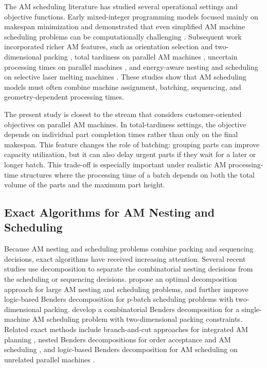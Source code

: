 \documentclass[review,3p,times,authoryear]{elsarticle}
\begin{document}
The AM scheduling literature has studied several operational settings and
objective functions. Early mixed-integer programming models focused mainly on
makespan minimization and demonstrated that even simplified AM machine
scheduling problems can be computationally challenging
\citep{kucukkocMILPModelsMinimise2019}. Subsequent work incorporated richer AM
features, such as orientation selection and two-dimensional packing
\citep{cheMachineSchedulingOrientation2021}, total tardiness on parallel AM
machines \citep{yuMathematicalModelsMinimizing2022}, uncertain processing times
on parallel machines \citep{wuNestingSchedulingParallel2025}, and energy-aware
nesting and scheduling on selective laser melting machines
\citep{yuMathematicalProgrammingModel2024}. These studies show that AM
scheduling models must often combine machine assignment, batching, sequencing,
and geometry-dependent processing times.

The present study is closest to the stream that considers customer-oriented
objectives on parallel AM machines. In total-tardiness settings, the objective
depends on individual part completion times rather than only on the final
makespan. This feature changes the role of batching: grouping parts can improve
capacity utilization, but it can also delay urgent parts if they wait for a
later or longer batch. This trade-off is especially important under realistic
AM processing-time structures where the processing time of a batch depends on
both the total volume of the parts and the maximum part height.

\subsection{Exact Algorithms for AM Nesting and Scheduling}

Because AM nesting and scheduling problems combine packing and sequencing
decisions, exact algorithms have received increasing attention. Several recent
studies use decomposition to separate the combinatorial nesting decisions from
the scheduling or sequencing decisions. \citet{nascimentoOptimalDecompositionApproach2024}
propose an optimal decomposition approach for large AM nesting and scheduling
problems, and \citet{nascimentoImprovingEfficiencyLogicbased2026} further
improve logic-based Benders decomposition for p-batch scheduling problems with
two-dimensional packing. \citet{maoCombinatorialBendersDecomposition2024}
develop a combinatorial Benders decomposition for a single-machine AM
scheduling problem with two-dimensional packing constraints. Related exact
methods include branch-and-cut approaches for integrated AM planning
\citep{zipfelNewBranchandcutApproach2024}, nested Benders decompositions for
order acceptance and AM scheduling
\citep{chenBendersDecompositionsOrder2026}, and logic-based Benders
decomposition for AM scheduling on unrelated parallel machines
\citep{chenLogicBasedBenders2026}.
\end{document}

